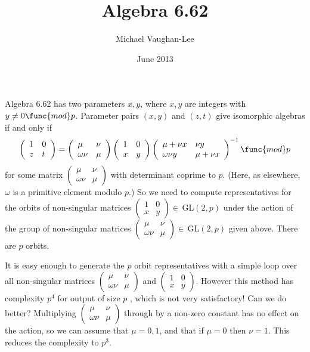 \documentclass[12pt]{article}
\begin{document}
\title{Algebra 6.62}
\author{Michael Vaughan-Lee}
\date{June 2013}
\maketitle

Algebra 6.62 has two parameters $x,y$, where $x,y$ are integers with $y\neq 0%
\func{mod}p$. Parameter pairs $(x,y)$ and $(z,t)$ give isomorphic algebras
if and only if%
\[
\left( 
\begin{array}{ll}
1 & 0 \\ 
z & t%
\end{array}%
\right) =\left( 
\begin{array}{ll}
\mu  & \nu  \\ 
\omega \nu  & \mu 
\end{array}%
\right) \left( 
\begin{array}{ll}
1 & 0 \\ 
x & y%
\end{array}%
\right) \left( 
\begin{array}{ll}
\mu +\nu x & \nu y \\ 
\omega \nu y & \mu +\nu x%
\end{array}%
\right) ^{-1}\func{mod}p
\]%
for some matrix $\left( 
\begin{array}{ll}
\mu  & \nu  \\ 
\omega \nu  & \mu 
\end{array}%
\right) $ with determinant coprime to $p$. (Here, as elsewhere, $\omega $ is
a primitive element modulo $p$.) So we need to compute representatives for
the orbits of non-singular matrices $\left( 
\begin{array}{ll}
1 & 0 \\ 
x & y%
\end{array}%
\right) \in \,$GL$(2,p)$ under the action of the group of non-singular
matrices $\left( 
\begin{array}{ll}
\mu  & \nu  \\ 
\omega \nu  & \mu 
\end{array}%
\right) \in \,$GL$(2,p)$ given above. There are $p$ orbits.

It is easy enough to generate the $p$ orbit representatives with a simple
loop over all non-singular matrices $\left( 
\begin{array}{ll}
\mu & \nu \\ 
\omega \nu & \mu%
\end{array}%
\right) $ and $\left( 
\begin{array}{ll}
1 & 0 \\ 
x & y%
\end{array}%
\right) $. However this method has complexity $p^{4}$ for output of size $p$%
, which is not very satisfactory! Can we do better? Multiplying $\left( 
\begin{array}{ll}
\mu & \nu \\ 
\omega \nu & \mu%
\end{array}%
\right) $ through by a non-zero constant has no effect on the action, so we
can assume that $\mu =0,1$, and that if $\mu =0$ then $\nu =1$. This reduces
the complexity to $p^{3}$.
\end{document}
